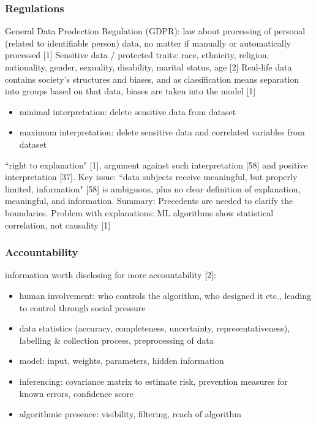 \subsubsection{Regulations}
General Data Prodection Regulation (GDPR): law about processing of personal (related to identifiable person) data, no matter if manually or automatically processed [1] \newline
Sensitive data / protected traits: race, ethnicity, religion, nationality, gender, sexuality, disability, marital status, age [2] \newline
Real-life data contains society's structures and biases, and as classification means separation into groups based on that data, biases are taken into the model [1] \newline
\begin{itemize}
	\item minimal interpretation: delete sensitive data from dataset
	\item maximum interpretation: delete sensitive data and correlated variables from dataset
\end{itemize}
``right to explanation" [1], argument against such interpretation [58] and positive interpretation [37]. Key issue: ``data subjects receive meaningful, but properly limited, information" [58] is ambiguous, plus no clear definition of explanation, meaningful, and information. Summary: Precedents are needed to clarify the boundaries.\newline
Problem with explanations: ML algorithms show statistical correlation, not causality [1]\newline


\subsubsection{Accountability}
information worth disclosing for more accountability [2]:
\begin{itemize}
	\item human involvement: who controls the algorithm, who designed it etc., leading to control through social pressure
	\item data statistics (accuracy, completeness, uncertainty, representativeness), labelling \& collection process, preprocessing of data
	\item model: input, weights, parameters, hidden information
	\item inferencing: covariance matrix to estimate risk, prevention measures for known errors, confidence score 
	\item algorithmic presence: visibility, filtering, reach of algorithm
\end{itemize}


